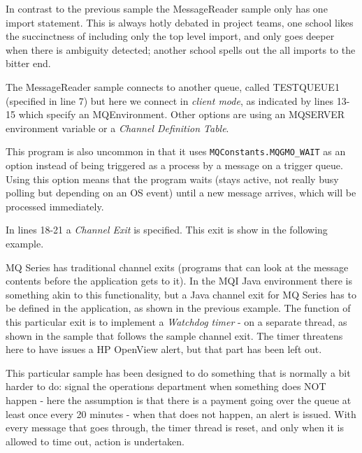 {
In contrast to the previous sample the MessageReader sample only has
one import statement. This is always hotly debated in project teams,
one school likes the succinctness of including only the top level
import, and only goes deeper when there is ambiguity detected; another
school spells out the all imports to the bitter end. 

The MessageReader sample connects to another queue, called TESTQUEUE1
(specified in line 7) but here we connect in \emph{client mode}, as
indicated by lines 13-15 which specify an MQEnvironment. Other
options are using an MQSERVER environment variable or a \emph{Channel
Definition Table}.

This program is also uncommon in that it uses
\texttt{MQConstants.MQGMO\_WAIT} as an option instead of being
triggered as a process by a message on a trigger queue. Using this
option means that the program waits (stays active, not really busy polling
but depending on an OS event) until a new
message arrives, which will be processed immediately.

In lines 18-21 a \emph{Channel Exit} is specified. This exit is show
in the following example.

 
MQ Series has traditional channel exits (programs that can look at the
message contents before the application gets to it). In the MQI Java
environment there is something akin to this functionality, but a Java
channel exit for MQ Series has to be defined in the application, as
shown in the previous example. The function of this particular exit is
to implement a \emph{Watchdog timer} - on a separate thread, as shown
in the sample that follows the sample channel exit. The timer
threatens here to have issues a HP OpenView alert, but that part has
been left out.

This particular sample has been designed to do something that is
normally a bit harder
to do: signal the operations department when something does NOT happen
- here the assumption is that there is a payment going over the queue
at least once every 20 minutes - when that does not happen, an alert
is issued. With every message that goes through, the timer thread is
reset, and only when it is allowed to time out, action is undertaken.

}
